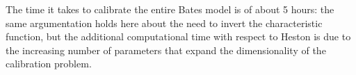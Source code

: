 The time it takes to calibrate the entire Bates model is of about 5 hours: the same argumentation holds here about the need to invert the characteristic function, but the additional computational time with respect to Heston is due to the increasing number of parameters that expand the dimensionality of the calibration problem.

